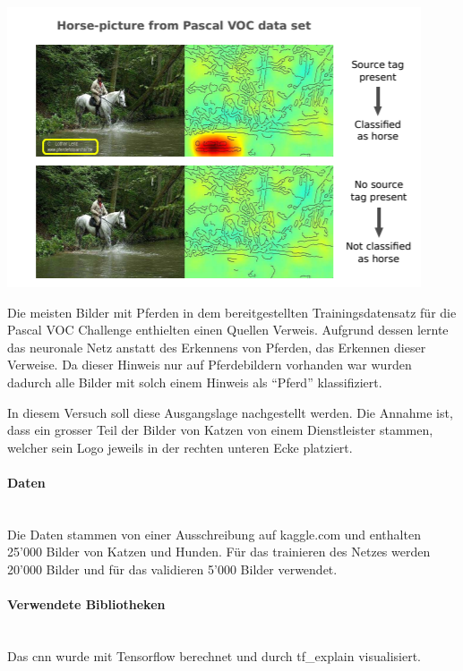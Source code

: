 \documentclass[
  12pt, %
  a4paper, %
  oneside, %
  openany, 
  numbers=noenddot, %
  BCOR=5mm, %
  parskip=half*, %
  thesis, %
]{bfhbook}
\newcommand{\parag}[1]{\paragraph*{#1}\mbox{}\\}
\begin{document}
\begin{center}
\begin{minipage}[t]{0.45\linewidth}
\vspace{0pt}
\includegraphics[width=\linewidth]{Bilder/HorsePredictionPascalVOC.PNG}
\end{minipage}\hfill
\begin{minipage}[t]{0.45\linewidth}
\vspace{20pt}
Die meisten Bilder mit Pferden in dem bereitgestellten Trainingsdatensatz für die Pascal VOC Challenge enthielten einen Quellen Verweis. Aufgrund dessen lernte das neuronale Netz anstatt des Erkennens von  Pferden, das Erkennen dieser Verweise. Da dieser Hinweis nur auf Pferdebildern vorhanden war wurden dadurch alle Bilder mit solch einem Hinweis als ``Pferd'' klassifiziert.
\end{minipage}
\end{center}

\break
In diesem Versuch soll diese Ausgangslage nachgestellt werden. Die Annahme ist, dass ein grosser Teil der Bilder von Katzen von einem Dienstleister stammen, welcher sein Logo jeweils in der rechten unteren Ecke platziert. 

\parag{Daten}
Die Daten stammen von einer Ausschreibung auf kaggle.com \cite{kaggleDogCats} und enthalten 25'000 Bilder von Katzen und Hunden. Für das trainieren des Netzes werden 20'000 Bilder und für das validieren 5'000 Bilder verwendet.

\parag{Verwendete Bibliotheken}
Das \Gls{cnn} wurde mit Tensorflow \cite{TensorFlow} berechnet und durch tf\_explain \cite{tfExplain} visualisiert.
\end{document}
